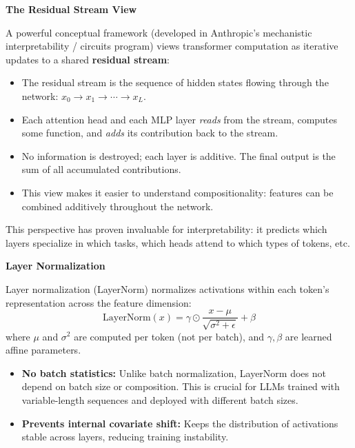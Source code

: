 \begin{intuitionbox}
\textbf{The Residual Stream View}

A powerful conceptual framework (developed in Anthropic's mechanistic interpretability / circuits program) views transformer computation as iterative updates to a shared \textbf{residual stream}:

\begin{itemize}
  \item The residual stream is the sequence of hidden states flowing through the network: $x_0 \to x_1 \to \cdots \to x_L$.
  \item Each attention head and each MLP layer \textit{reads} from the stream, computes some function, and \textit{adds} its contribution back to the stream.
  \item No information is destroyed; each layer is additive. The final output is the sum of all accumulated contributions.
  \item This view makes it easier to understand compositionality: features can be combined additively throughout the network.
\end{itemize}

This perspective has proven invaluable for interpretability: it predicts which layers specialize in which tasks, which heads attend to which types of tokens, etc.
\end{intuitionbox}

\begin{notebox}
\textbf{Layer Normalization}

Layer normalization (LayerNorm) normalizes activations within each token's representation across the feature dimension:
\[
  \text{LayerNorm}(x) = \gamma \odot \frac{x - \mu}{\sqrt{\sigma^2 + \epsilon}} + \beta
\]
where $\mu$ and $\sigma^2$ are computed per token (not per batch), and $\gamma, \beta$ are learned affine parameters.

\begin{itemize}
  \item \textbf{No batch statistics:} Unlike batch normalization, LayerNorm does not depend on batch size or composition. This is crucial for LLMs trained with variable-length sequences and deployed with different batch sizes.
  \item \textbf{Prevents internal covariate shift:} Keeps the distribution of activations stable across layers, reducing training instability.
\end{itemize}
\end{notebox}

